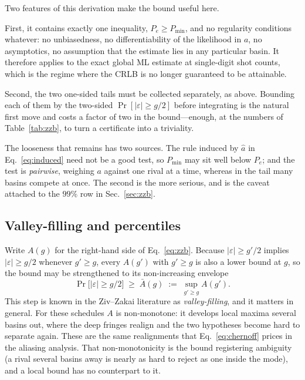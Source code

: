 \documentclass[%
 twocolumn,
 amsmath,amssymb,
prx,
longbibliography
]{revtex4-2}
\begin{document}
Two features of this derivation make the bound useful here.

First, it contains exactly one inequality, $P_e \ge P_{\min}$, and no regularity conditions whatever: no unbiasedness, no differentiability of the likelihood in $a$, no asymptotics, no assumption that the estimate lies in any particular basin. It therefore applies to the exact global \ac{ML} estimate at single-digit shot counts, which is the regime where the \ac{CRLB} is no longer guaranteed to be attainable.

Second, the two one-sided tails must be collected separately, as above. Bounding each of them by the two-sided $\Pr[|\varepsilon| \ge g/2]$ before integrating is the natural first move and costs a factor of two in the bound---enough, at the numbers of Table~\ref{tab:zzb}, to turn a certificate into a triviality.

The looseness that remains has two sources. The rule induced by $\hat a$ in Eq.~\eqref{eq:induced} need not be a good test, so $P_{\min}$ may sit well below $P_e$; and the test is \emph{pairwise}, weighing $a$ against one rival at a time, whereas in the tail many basins compete at once. The second is the more serious, and is the caveat attached to the $99\%$ row in Sec.~\ref{sec:zzb}.

\subsection{Valley-filling and percentiles}\label{app:zzb:valley}

Write $A(g)$ for the right-hand side of Eq.~\eqref{eq:zzb}. Because $|\varepsilon| \ge g'/2$ implies $|\varepsilon| \ge g/2$ whenever $g' \ge g$, every $A(g')$ with $g' \ge g$ is also a lower bound at $g$, so the bound may be strengthened to its non-increasing envelope
\begin{equation}\label{eq:valleyfill}
    \Pr\big[|\varepsilon| \ge g/2\big] \;\ge\; \bar A(g) \;:=\; \sup_{g' \ge g} A(g') .
\end{equation}
This step is known in the Ziv--Zakai literature as \emph{valley-filling}, and it matters in general. For these schedules $A$ is non-monotone: it develops local maxima several basins out, where the deep fringes realign and the two hypotheses become hard to separate again. These are the same realignments that Eq.~\eqref{eq:chernoff} prices in the aliasing analysis. That non-monotonicity is the bound registering ambiguity (a rival several basins away is nearly as hard to reject as one inside the mode), and a local bound has no counterpart to it.
\end{document}
